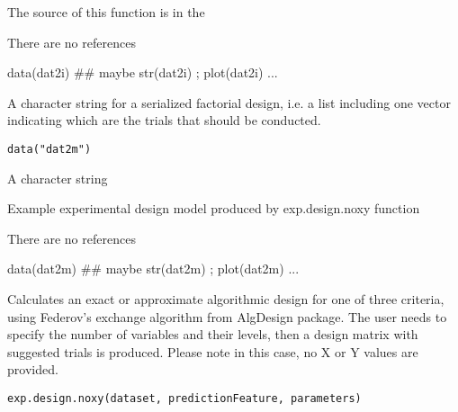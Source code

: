 \documentclass[letterpaper]{book}
\begin{document}
%
\begin{Source}\relax
The source of this function is in the
\end{Source}
%
\begin{References}\relax
There are no references
\end{References}
%
\begin{Examples}
\begin{ExampleCode}
data(dat2i)
## maybe str(dat2i) ; plot(dat2i) ...
\end{ExampleCode}
\end{Examples}
%
\begin{Description}\relax
A character string for a serialized factorial design, i.e. a list including one vector indicating which are the trials that should be conducted.
\end{Description}
%
\begin{Usage}
\begin{verbatim}
data("dat2m")
\end{verbatim}
\end{Usage}
%
\begin{Format}
A character string
\end{Format}
%
\begin{Details}\relax
Example experimental design model produced by exp.design.noxy function
\end{Details}
%
\begin{References}\relax
There are no references
\end{References}
%
\begin{Examples}
\begin{ExampleCode}
data(dat2m)
## maybe str(dat2m) ; plot(dat2m) ...
\end{ExampleCode}
\end{Examples}
%
\begin{Description}\relax
Calculates an exact or approximate algorithmic design for one of three criteria, using Federov's exchange algorithm from AlgDesign package. The user needs to specify the number of variables and their levels, then a design matrix with suggested trials is produced. Please note in this case, no X or Y values are provided.
\end{Description}
%
\begin{Usage}
\begin{verbatim}
exp.design.noxy(dataset, predictionFeature, parameters)
\end{verbatim}
\end{Usage}
\end{document}
